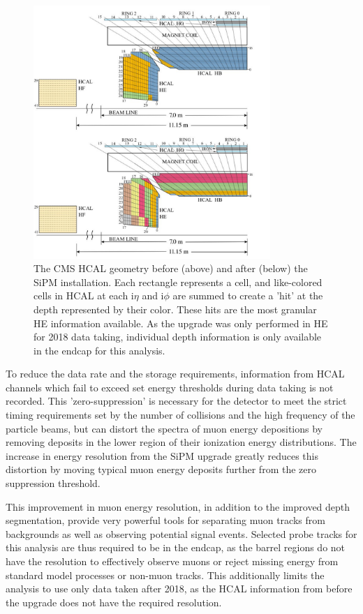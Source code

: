 \begin{figure}[!htpb]
	   \centering
	      \includegraphics[width=0.8\textwidth]{figures/HE_upgrade.pdf}
		 \caption[The 2018 HE upgrade]{The CMS HCAL geometry before (above) and after (below) the SiPM installation. Each rectangle represents a cell, and like-colored cells in HCAL at each i$\eta$ and i$\phi$ are summed to create a 'hit' at the depth represented by their color. These hits are the most granular HE information available. As the upgrade was only performed in HE for 2018 data taking, individual depth information is only available in the endcap for this analysis.}
	    \label{fig:HElayout}
\end{figure}

To reduce the data rate and the storage requirements, information from HCAL channels which fail to exceed set energy thresholds during data taking is not recorded. 
This 'zero-suppression' is necessary for the detector to meet the strict timing requirements set by the number of collisions and the high frequency of the particle beams, but can distort the spectra of muon energy depositions by removing deposits in the lower region of their ionization energy distributions.
The increase in energy resolution from the SiPM upgrade greatly reduces this distortion by moving typical muon energy deposits further from the zero suppression threshold.
 
This improvement in muon energy resolution, in addition to the improved depth segmentation, provide very powerful tools for separating muon tracks from backgrounds as well as observing potential signal events.
Selected probe tracks for this analysis are thus required to be in the endcap, as the barrel regions do not have the resolution to effectively observe muons or reject missing energy from standard model processes or non-muon tracks.
This additionally limits the analysis to use only data taken after 2018, as the HCAL information from before the upgrade does not have the required resolution.

